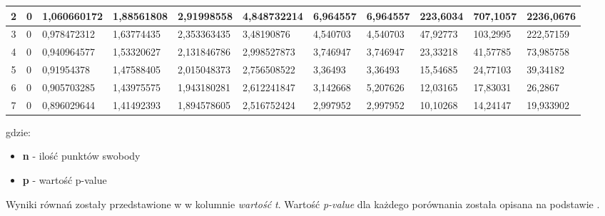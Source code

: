 \begin{itemize}
\begin{table}[H]
{\begin{tabular}{|c|l|l|l|l|l|l|l|l|l|l|}
                2 & 0 & 1,060660172 & 1,88561808 & 2,91998558 & 4,848732214 & 6,964557 & 6,964557 & 223,6034 & 707,1057 & 2236,0676 \\ \hline
                3 & 0 & 0,978472312 & 1,63774435 & 2,353363435 & 3,48190876 & 4,540703 & 4,540703 & 47,92773 & 103,2995 & 222,57159 \\ \hline
                4 & 0 & 0,940964577 & 1,53320627 & 2,131846786 & 2,998527873 & 3,746947 & 3,746947 & 23,33218 & 41,57785 & 73,985758 \\ \hline
                5 & 0 & 0,91954378 & 1,47588405 & 2,015048373 & 2,756508522 & 3,36493 & 3,36493 & 15,54685 & 24,77103 & 39,34182 \\ \hline
                6 & 0 & 0,905703285 & 1,43975575 & 1,943180281 & 2,612241847 & 3,142668 & 5,207626 & 12,03165 & 17,83031 & 26,2867 \\ \hline
                7 & 0 & 0,896029644 & 1,41492393 & 1,894578605 & 2,516752424 & 2,997952 & 2,997952 & 10,10268 & 14,24147 & 19,933902 \\ \hline
            \end{tabular}%
        }
        \label{tab:p-val}
    \end{table}
    gdzie:
    \begin{itemize}
        \item \textbf{n} - ilość punktów swobody
        \item \textbf{p} - wartość p-value
    \end{itemize}
    Wyniki równań zostały przedstawione w  w kolumnie \textit{wartość t}. Wartość \textit{p-value} dla każdego porównania została opisana na podstawie .


\end{itemize}
